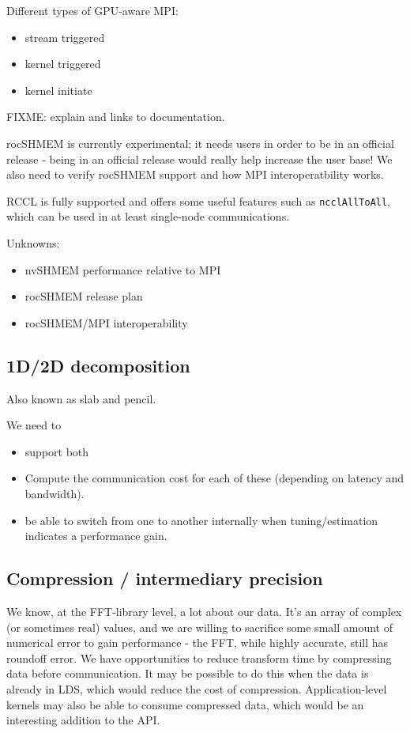 \documentclass[12pt]{article}
\renewcommand{\(}{\left(}
\renewcommand{\)}{\right)}
\begin{document}
Different types of GPU-aware MPI:
\begin{itemize}
\item stream triggered
\item kernel triggered
\item kernel initiate
\end{itemize}
FIXME: explain and links to documentation.

rocSHMEM is currently experimental; it needs users in order to be in
an official release - being in an official release would really help
increase the user base!  We also need to verify rocSHMEM support and
how MPI interoperatbility works.

RCCL is fully supported and offers some useful features such as
\texttt{ncclAllToAll}, which can be used in at least single-node
communications.

Unknowns:
\begin{itemize}
\item nvSHMEM performance relative to MPI
\item rocSHMEM release plan
\item rocSHMEM/MPI interoperability
\end{itemize}

\subsection{1D/2D decomposition}

Also known as slab and pencil.

We need to
\begin{itemize}
\item support both
\item Compute the communication cost for each of these (depending on
  latency and bandwidth).
\item be able to switch from one to another internally when
  tuning/estimation indicates a performance gain.
\end{itemize}


\subsection{Compression / intermediary precision}

We know, at the FFT-library level, a lot about our data.  It's an
array of complex (or sometimes real) values, and we are willing to
sacrifice some small amount of numerical error to gain performance -
the FFT, while highly accurate, still has roundoff error.  We have
opportunities to reduce transform time by compressing data before
communication.  It may be possible to do this when the data is already
in LDS, which would reduce the cost of compression.  Application-level
kernels may also be able to consume compressed data, which would be an
interesting addition to the API.
\end{document}
